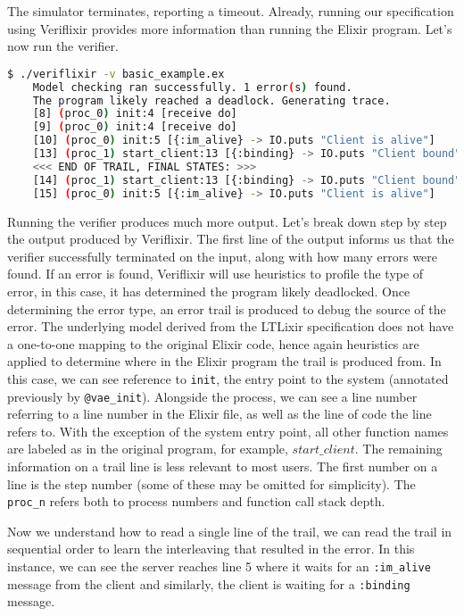 The simulator terminates, reporting a timeout. Already, running our specification using Veriflixir provides more information than running the Elixir program. Let's now run the verifier.
\begin{lstlisting}[language=bash, xleftmargin=.2\linewidth]
    $ ./veriflixir -v basic_example.ex
    Model checking ran successfully. 1 error(s) found.
    The program likely reached a deadlock. Generating trace.
    [8] (proc_0) init:4 [receive do]
    [9] (proc_0) init:4 [receive do]
    [10] (proc_0) init:5 [{:im_alive} -> IO.puts "Client is alive"]
    [13] (proc_1) start_client:13 [{:binding} -> IO.puts "Client bound"]
    <<< END OF TRAIL, FINAL STATES: >>>
    [14] (proc_1) start_client:13 [{:binding} -> IO.puts "Client bound"]
    [15] (proc_0) init:5 [{:im_alive} -> IO.puts "Client is alive"]
\end{lstlisting}
Running the verifier produces much more output. Let's break down step by step the output produced by Veriflixir. The first line of the output informs us that the verifier successfully terminated on the input, along with how many errors were found. If an error is found, Veriflixir will use heuristics to profile the type of error, in this case, it has determined the program likely deadlocked. Once determining the error type, an error trail is produced to debug the source of the error. The underlying model derived from the LTLixir specification does not have a one-to-one mapping to the original Elixir code, hence again heuristics are applied to determine where in the Elixir program the trail is produced from. In this case, we can see reference to \texttt{init}, the entry point to the system (annotated previously by \texttt{@vae\_init}). Alongside the process, we can see a line number referring to a line number in the Elixir file, as well as the line of code the line refers to. With the exception of the system entry point, all other function names are labeled as in the original program, for example, $start\_client$. The remaining information on a trail line is less relevant to most users. The first number on a line is the step number (some of these may be omitted for simplicity). The \texttt{proc\_n} refers both to process numbers and function call stack depth.
\par
Now we understand how to read a single line of the trail, we can read the trail in sequential order to learn the interleaving that resulted in the error. In this instance, we can see the server reaches line 5 where it waits for an \texttt{:im\_alive} message from the client and similarly, the client is waiting for a \texttt{:binding} message.
